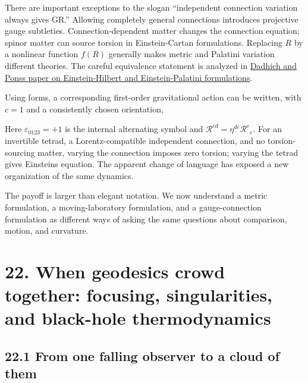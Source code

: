 \documentclass[
  11pt,
  letterpaper,
  oneside,
  openany]{scrbook}
\begin{document}
There are important exceptions to the slogan ``independent connection
variation always gives GR.'' Allowing completely general connections
introduces projective gauge subtleties. Connection-dependent matter
changes the connection equation; spinor matter can source torsion in
Einstein-Cartan formulations. Replacing \(R\) by a nonlinear function
\(f(R)\) generally makes metric and Palatini variation different
theories. The careful equivalence statement is analyzed in
\href{https://arxiv.org/abs/1010.0869}{Dadhich and
Pons\textquotesingle s paper on Einstein-Hilbert and Einstein-Palatini
formulations}.

Using forms, a corresponding first-order gravitational action can be
written, with \(c=1\) and a consistently chosen orientation,

\begin{center}
\begingroup
{}
\ifdim\wd\grmathbox>\linewidth
\resizebox{\linewidth}{!}{\usebox{\grmathbox}}
\else\usebox{\grmathbox}\fi
\endgroup
\end{center}

Here \(\varepsilon_{0123}=+1\) is the internal alternating symbol and
\(\mathcal R^{cd}=\eta^{de}\mathcal R^c{}_e\). For an invertible tetrad,
a Lorentz-compatible independent connection, and no torsion-sourcing
matter, varying the connection imposes zero torsion; varying the tetrad
gives Einstein\textquotesingle s equation. The apparent change of
language has exposed a new organization of the same dynamics.

The payoff is larger than elegant notation. We now understand a metric
formulation, a moving-laboratory formulation, and a gauge-connection
formulation as different ways of asking the same questions about
comparison, motion, and curvature.

\hypertarget{chapter-22}{%
\chapter{22. When geodesics crowd together: focusing, singularities, and
black-hole thermodynamics}\label{chapter-22}}

\hypertarget{from-one-falling-observer-to-a-cloud-of-them}{%
\section{22.1 From one falling observer to a cloud of
them}\label{from-one-falling-observer-to-a-cloud-of-them}}
\end{document}
